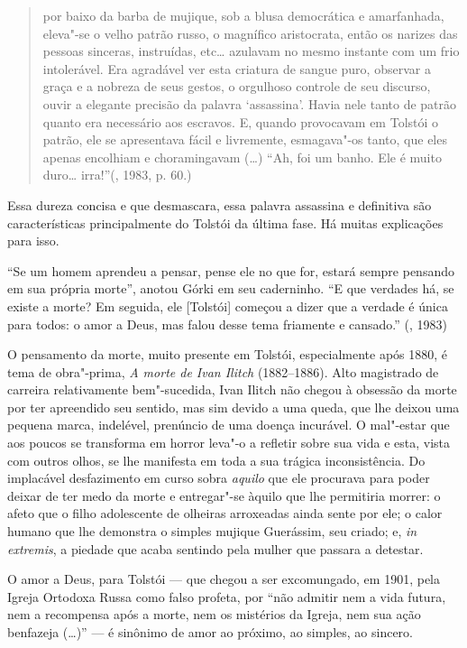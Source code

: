 \begin{quote}
por baixo da barba de mujique, sob a blusa democrática e amarfanhada, eleva"-se o velho patrão russo, o magnífico aristocrata, então os narizes das pessoas sinceras, instruídas, etc\ldots{} azulavam no mesmo instante com um frio intolerável. Era agradável ver esta criatura de sangue puro, observar a graça e a nobreza de seus gestos, o orgulhoso controle de seu discurso, ouvir a
elegante precisão da palavra `assassina'. Havia nele tanto de patrão quanto era necessário aos escravos. E, quando provocavam em Tolstói o patrão, ele se apresentava fácil e livremente, esmagava"-os tanto, que eles apenas encolhiam e choramingavam (\ldots{}) ``Ah, foi um banho. Ele é muito duro\ldots{} irra!''(, 1983, p. 60.)
\end{quote}

Essa dureza concisa e que desmascara, essa palavra
assassina e definitiva são características principalmente do Tolstói
da última fase. Há muitas explicações para isso.

``Se um homem aprendeu a pensar, pense ele no que
for, estará sempre pensando em sua própria morte'', anotou Górki em
seu caderninho. ``E que verdades há, se existe a morte? Em seguida,
ele [Tolstói] começou a dizer que a verdade é única para todos: o
amor a Deus, mas falou desse tema friamente e cansado.'' (, 1983)

O pensamento da morte, muito presente em Tolstói, especialmente após 1880, é tema de obra"-prima, \emph{A morte de Ivan Ilitch} (1882--1886). Alto magistrado de carreira relativamente bem"-sucedida, Ivan Ilitch não chegou à obsessão da morte por ter apreendido seu sentido, mas sim devido a uma queda, que lhe deixou uma pequena marca, indelével, prenúncio de uma doença incurável. O mal"-estar que aos poucos se transforma em horror leva"-o a refletir sobre sua vida e esta, vista com outros olhos, se
lhe manifesta em toda a sua trágica inconsistência. Do implacável desfazimento em curso sobra \emph{aquilo} que ele procurava
para poder deixar de ter medo da morte e entregar"-se àquilo que lhe permitiria morrer: o afeto que o filho adolescente de olheiras
arroxeadas ainda sente por ele; o calor humano que lhe demonstra o simples mujique Guerássim, seu criado; e, \emph{in extremis}, a
piedade que acaba sentindo pela mulher que passara a detestar.

O amor a Deus, para Tolstói --- que chegou a ser excomungado, em 1901, pela
Igreja Ortodoxa Russa como falso profeta,
por ``não admitir nem a vida futura, nem a recompensa após a
morte, nem os mistérios da Igreja, nem sua ação benfazeja (\ldots{})'' --- é
sinônimo de amor ao próximo, ao simples, ao sincero.

